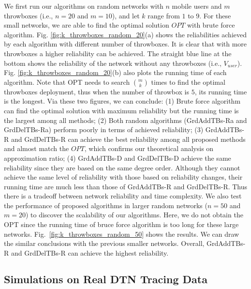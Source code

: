 \documentclass[10pt,conference,compsocconf,letterpaper]{IEEEtran}
\begin{document}
We first run our algorithms on random networks with $n$ mobile users and $m$ throwboxes (i.e., $n=20$ and $m=10$), and let $k$ range from $1$ to $9$. For these small networks, we are able to find the optimal solution $OPT$ with brute force algorithm. Fig. \ref{fig:k_throwboxes_random_20}(a) shows the reliabilities achieved by each algorithm with different number of throwboxes. It is clear that with more throwboxes a higher reliability can be achieved. The straight blue line at the bottom shows the reliability of the network without any throwboxes (i.e., $V_{user}$). Fig. \ref{fig:k_throwboxes_random_20}(b) also plots the running time of each algorithm. Note that OPT needs to search $\binom{m}{k}$ times to find the optimal throwboxes deployment, thus when the number of throwbox is $5$, its running time is the longest. Via these two figures, we can conclude: (1) Brute force algorithm can find the optimal solution with maximum reliability but the running time is the largest among all methods; (2) Both random algorithms (GrdAddTBs-Ra and GrdDelTBs-Ra) perform poorly in terms of achieved reliability; (3) GrdAddTBs-R and GrdDelTBs-R can achieve the best reliability among all proposed methods and almost match the $OPT$, which confirms our theoretical analysis on approximation ratio; (4) GrdAddTBs-D and GrdDelTBs-D achieve the same reliability since they are based on the same degree order. Although they cannot achieve the same level of reliability with those based on reliability changes, their running time are much less than those of GrdAddTBs-R and GrdDelTBs-R. Thus there is a tradeoff between network reliability and time complexity. We also test the performance of proposed algorithms in larger random networks ($n=50$ and $m=20$) to discover the scalability of our algorithms. Here, we do not obtain the OPT since the running time of bruce force algorithm is too long for these large networks. Fig.~\ref{fig:k_throwboxes_random_50} shows the results. We can draw the similar conclusions with the previous smaller networks. Overall, GrdAddTBs-R and GrdDelTBs-R can achieve the highest reliability.


\subsection{Simulations on Real DTN Tracing Data}
\label{sec:trace}
\end{document}
